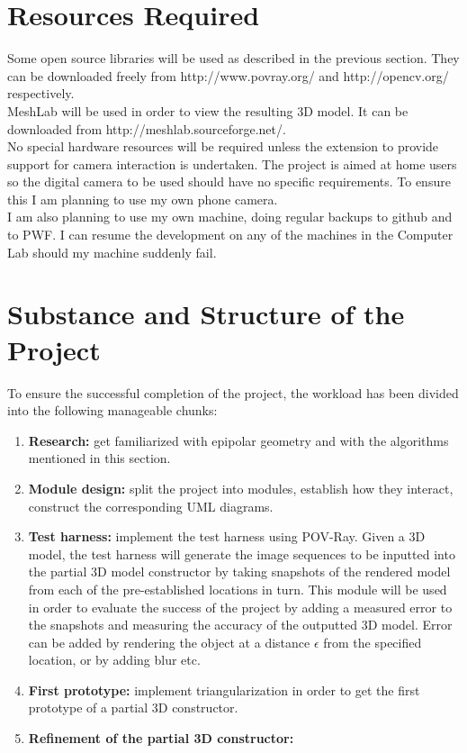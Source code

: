 \section*{Resources Required}
Some open source libraries will be used as described in the previous section. They can be downloaded freely from http://www.povray.org/ and http://opencv.org/ respectively.\\
MeshLab will be used in order to view the resulting 3D model. It can be downloaded from http://meshlab.sourceforge.net/.\\
No special hardware resources will be required unless the extension to provide support for camera interaction is undertaken. The project is aimed at home users so the digital camera to be used should have no specific requirements. To ensure this I am planning to use my own phone camera.\\

I am also planning to use my own machine, doing regular backups to github and to PWF. I can resume the development on any of the machines in the Computer Lab should my machine suddenly fail. 

\section*{Substance and Structure of the Project}
To ensure the successful completion of the project, the workload has been divided into the following manageable chunks:
\begin{enumerate}
\item {\bf Research:} get familiarized with epipolar geometry and with the algorithms mentioned in this section. 
\item {\bf Module design:} split the project into modules, establish how they interact, construct the corresponding UML diagrams. 
\item {\bf Test harness:} implement the test harness using POV-Ray. Given a 3D model, the test harness will generate the image sequences to be inputted into the partial 3D model constructor by taking snapshots of the rendered model from each of the pre-established locations in turn. This module will be used in order to evaluate the success of the project by adding a measured error to the snapshots and measuring the accuracy of the outputted 3D model. Error can be added by rendering the object at a distance $\epsilon$ from the specified location, or by adding blur etc.
\item {\bf First prototype:} implement triangularization in order to get the first prototype of a partial 3D constructor.
\item {\bf Refinement of the partial 3D constructor:}    
\end{enumerate}


